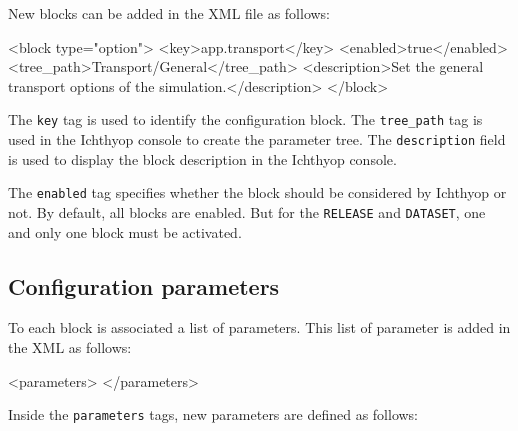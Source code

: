\documentclass[
  letterpaper,
  DIV=11,
  numbers=noendperiod]{scrreprt}
\newenvironment{Shaded}{\begin{snugshade}}{\end{snugshade}}
\newcommand{\KeywordTok}[1]{\textcolor[rgb]{0.00,0.23,0.31}{#1}}
\newcommand{\NormalTok}[1]{\textcolor[rgb]{0.00,0.23,0.31}{#1}}
\newcommand{\OtherTok}[1]{\textcolor[rgb]{0.00,0.23,0.31}{#1}}
\newcommand{\StringTok}[1]{\textcolor[rgb]{0.13,0.47,0.30}{#1}}
\begin{document}
New blocks can be added in the XML file as follows:

\begin{Shaded}
\begin{Highlighting}[]
\NormalTok{\textless{}}\KeywordTok{block}\OtherTok{ type=}\StringTok{"option"}\NormalTok{\textgreater{}}
\NormalTok{        \textless{}}\KeywordTok{key}\NormalTok{\textgreater{}app.transport\textless{}/}\KeywordTok{key}\NormalTok{\textgreater{}}
\NormalTok{        \textless{}}\KeywordTok{enabled}\NormalTok{\textgreater{}true\textless{}/}\KeywordTok{enabled}\NormalTok{\textgreater{}}
\NormalTok{        \textless{}}\KeywordTok{tree\_path}\NormalTok{\textgreater{}Transport/General\textless{}/}\KeywordTok{tree\_path}\NormalTok{\textgreater{}}
\NormalTok{        \textless{}}\KeywordTok{description}\NormalTok{\textgreater{}Set the general transport options of the simulation.\textless{}/}\KeywordTok{description}\NormalTok{\textgreater{}}
\NormalTok{\textless{}/}\KeywordTok{block}\NormalTok{\textgreater{}}
\end{Highlighting}
\end{Shaded}

The \texttt{key} tag is used to identify the configuration block. The
\texttt{tree\_path} tag is used in the Ichthyop console to create the
parameter tree. The \texttt{description} field is used to display the
block description in the Ichthyop console.

The \texttt{enabled} tag specifies whether the block should be
considered by Ichthyop or not. By default, all blocks are enabled. But
for the \texttt{RELEASE} and \texttt{DATASET}, one and only one block
must be activated.

\subsection{Configuration parameters}\label{configuration-parameters}

To each block is associated a list of parameters. This list of parameter
is added in the XML as follows:

\begin{Shaded}
\begin{Highlighting}[]
\NormalTok{\textless{}}\KeywordTok{parameters}\NormalTok{\textgreater{}}
\NormalTok{\textless{}/}\KeywordTok{parameters}\NormalTok{\textgreater{}}
\end{Highlighting}
\end{Shaded}

Inside the \texttt{parameters} tags, new parameters are defined as
follows:
\end{document}
